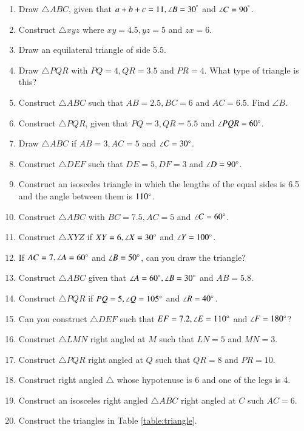 \documentclass[journal,12pt,twocolumn]{IEEEtran}
\renewcommand\thesection{\arabic{section}}
\begin{document}
\begin{enumerate}[label=\thesection.\arabic*
,ref=\thesection.\theenumi]
Solving the equivalent matrix equation gives the desired answer.
\item Draw $\triangle ABC$,  given that $a+b+c = 11, \angle B = 30^{\degree}$ and $\angle C = 90^{\degree}$.
\item Construct $\triangle xyz$ where $xy = 4.5, yz = 5$ and $zx = 6$.
\item Draw an equilateral triangle of side $5.5$.
\item Draw $\triangle PQR$ with $PQ = 4, QR = 3.5$ and $PR = 4$.  What type of triangle is this?
\item Construct $\triangle ABC$ such that $AB = 2.5, BC = 6$ and $AC = 6.5$.  Find $\angle B$.
\item Construct $\triangle PQR$, given that $PQ = 3, QR = 5.5$ and $\angle PQR = 60 \degree$.
\item Draw $\triangle ABC$ if $AB = 3, AC = 5$ and $\angle C = 30 \degree$.
\item Construct $\triangle DEF$ such that $DE = 5, DF = 3$ and $\angle D = 90\degree$.
\item Construct an isosceles triangle in which the lengths of the equal sides is 6.5 and the angle between them is $110\degree$.
\item Construct $\triangle ABC$  with $BC = 7.5, AC = 5$ and $\angle C = 60\degree$.
\item Construct $\triangle XYZ$ if $XY = 6, \angle X = 30\degree$ and $\angle Y = 100 \degree$.
\item If $AC = 7, \angle A = 60\degree$ and $\angle B = 50 \degree$, can you draw the triangle?
\item Construct $\triangle ABC$ given that $\angle A = 60\degree, \angle B = 30\degree$ and $AB = 5.8$.
\item Construct $\triangle PQR$ if $PQ = 5, \angle Q = 105 \degree$ and $\angle R = 40 \degree$.
\item Can you construct $\triangle DEF$ such that $EF = 7.2, \angle E = 110\degree$ and $\angle F = 180\degree$?
\item Construct  $\triangle LMN$ right angled at $M$ such that $LN = 5$ and $MN = 3$.
\item Construct  $\triangle PQR$ right angled at $Q$ such that $QR = 8$ and $PR = 10$.
\item Construct  right angled $\triangle $ whose hypotenuse  is 6 and one of the legs is 4.
\item Construct  an isosceles right angled $\triangle ABC$ right angled at $C$ such $AC = 6$.
\item Construct the  triangles in Table \ref{table:triangle}.
\begin{table}[!ht]

\caption{}
\label{table:triangle}
\end{table}

\end{enumerate}
\end{document}

